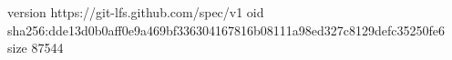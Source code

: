 version https://git-lfs.github.com/spec/v1
oid sha256:dde13d0b0aff0e9a469bf336304167816b08111a98ed327c8129defc35250fe6
size 87544
